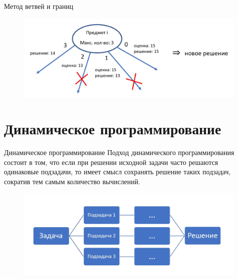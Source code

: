 \documentclass[ignoreonframetext,unicode]{beamer}
\begin{document}
			
		\begin{frame}{Метод ветвей и границ}
			\begin{figure}[H]
				\includegraphics[scale=0.23]{мвг}
			\end{figure}
			\end{frame}
		
		
	\section{Динамическое программирование}
	\begin{frame}{Динамическое программирование}
	Подход динамического программирования состоит в том, что если при решении исходной задачи часто решаются одинаковые подзадачи, то имеет смысл сохранять решение таких подзадач, сократив тем самым количество вычислений. 
	\begin{figure}[H]
		\includegraphics[scale=0.23]{дп}
	\end{figure}
	\end{frame}
			
\end{document}

